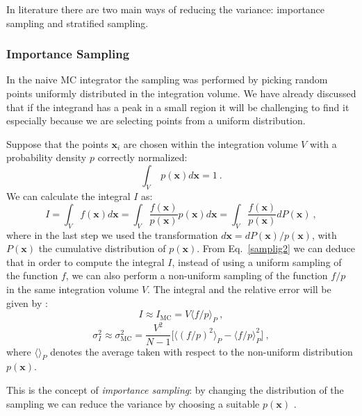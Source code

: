 \documentclass[../main/main.tex]{subfiles}
\begin{document}
In literature there are two main ways of reducing the variance: importance sampling and stratified sampling.

\subsubsection{Importance Sampling}
In the naive MC integrator the sampling was performed by picking random points uniformly distributed in the integration volume. 
We have already discussed that if the integrand has a peak in a small region it will be challenging to find it especially because we are selecting points from a uniform distribution. 

Suppose that the points $\textbf{x}_i$ are chosen within the integration volume $V$ with a probability density $p$ correctly normalized:
\begin{equation}
	\label{normalization}
	\int_{V} \;  p(\textbf{x})  d \textbf{x}  = 1 \ .
\end{equation}
We can calculate the integral $I$ as:
\begin{equation}
	\label{samplig2}
	I = \int_{V}   f(\textbf{x})  d \textbf{x}  =\int_{V}   \frac{f(\textbf{x})}{ p(\textbf{x})} p(\textbf{x})  d\textbf{x}
	= \int_{V}  \frac{f(\textbf{x})}{ p(\textbf{x})} dP(\textbf{x}) \ ,
\end{equation}
where in the last step we used the transformation $d\textbf{x} = dP(\textbf{x})/p(\textbf{x}) $, with $P(\textbf{x})$ the 
cumulative distribution of  $p(\textbf{x}) $.
\newline
From Eq.~\ref{samplig2} we can deduce that in order to compute the integral $I$, instead of using a uniform sampling of the function $f$,
we can also perform a non-uniform sampling of the function $f/p$ in the same integration volume $V$.
\newline
The integral and the relative error will be given by \cite{unknown}:
\begin{equation}
	I \approx I_{\text{MC}}  = V \langle f/p \rangle_P \ ,
\end{equation}
\begin{equation}
	\label{sigma_IP}
	\sigma^2_I \approx \sigma^2_\text{MC} = \frac{V^2}{N-1} \bigg[\langle (f/p)^2 \rangle_P - \langle f/p \rangle^2_P \bigg] \ ,
\end{equation}
where $\langle \rangle_P$ denotes the average taken with respect to the non-uniform distribution $p(\textbf{x})$.

This is the concept of \emph{importance sampling}: by changing the distribution of the sampling we can reduce the variance by choosing
a suitable $p(\textbf{x})$ \cite{Lepage:1977sw, Lepage:2020tgj, unknown}.
\end{document}
